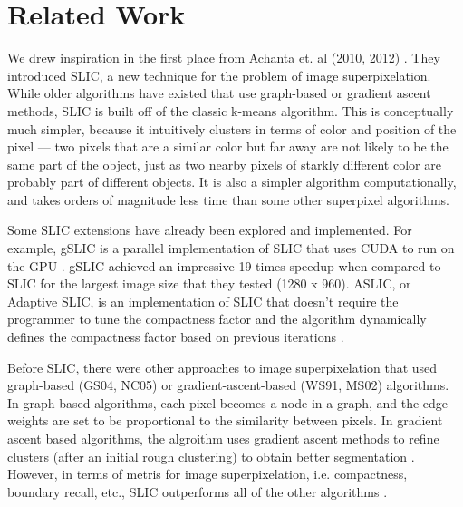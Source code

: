 \documentclass[11pt]{article}
\begin{document}
\section {Related Work}\label{rel}

We drew inspiration in the first place from Achanta et. al (2010, 2012) \cite{slic}\cite{slic2012}. They introduced SLIC, a new technique for the problem of image superpixelation. While older algorithms have existed that use graph-based or gradient ascent methods, SLIC is built off of the classic k-means algorithm. This is conceptually much simpler, because it intuitively clusters in terms of color and position of the pixel --- two pixels that are a similar color but far away are not likely to be the same part of the object, just as two nearby pixels of starkly different color are probably part of different objects. It is also a simpler algorithm computationally, and takes orders of magnitude less time than some other superpixel algorithms.

Some SLIC extensions have already been explored and implemented. For example, gSLIC is a parallel implementation of SLIC that uses CUDA to run on the GPU \cite{gslic}. gSLIC achieved an impressive 19 times speedup when compared to SLIC for the largest image size that they tested (1280 x 960). ASLIC, or Adaptive SLIC, is an implementation of SLIC that doesn't require the programmer to tune the compactness factor and the algorithm dynamically defines the compactness factor based on previous iterations \cite{slic2012}.

Before SLIC, there were other approaches to image superpixelation that used graph-based (GS04, NC05) or gradient-ascent-based (WS91, MS02) algorithms. In graph based algorithms, each pixel becomes a node in a graph, and the edge weights are set to be proportional to the similarity between pixels. In gradient ascent based algorithms, the algroithm uses gradient ascent methods to refine clusters (after an initial rough clustering) to obtain better segmentation \cite{slic}.  However, in terms of metris for image superpixelation, i.e. compactness, boundary recall, etc., SLIC outperforms all of the other algorithms \cite{slic}.\\

\end{document}
